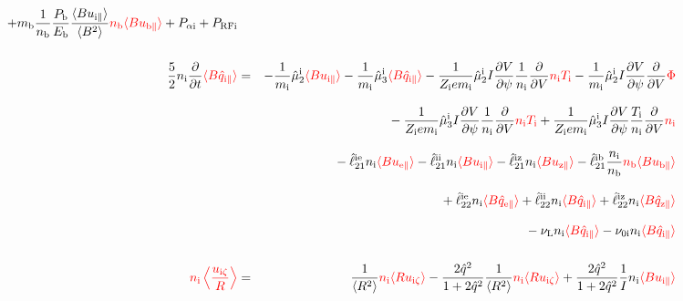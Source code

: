 \documentclass[11pt]{article}
\def\r#1{{\rm#1}}
\def\ave#1{\left\langle#1\right\rangle}
\def\aves#1{\langle#1\rangle}
\def\dd#1#2{\frac{\partial #1}{\partial #2}}
\def\para{\parallel}
\def\ddV{\frac{\partial}{\partial V}}
\def\ddt{\frac{\partial}{\partial t}}
\def\mi{m_\r{i}}
\def\mb{m_\r{b}}
\def\ni{n_\r{i}}
\def\nb{n_\r{b}}
\def\Ti{T_\r{i}}
\def\Zi{Z_\r{i}}
\def\uzt#1{u_{\r{#1}\zeta}}
\def\upara#1{u_{\r{#1}\para}}
\def\qhatpara#1{\hat{q}_{\r{#1}\para}}
\def\nun#1{\nu_\r{0#1}}
\def\PRF#1{P_\r{RF#1}}
\def\Palp#1{P_{\alpha\r{#1}}}
\def\Pb{P_\r{b}}
\def\Eb{E_\r{b}}
\def\nuL{\nu_\r{L}}
\def\red#1{\textcolor{red}{#1}}
\begin{document}
\begin{eqnarray}
%
  + \mb \frac{1}{\nb} \frac{\Pb}{\Eb} \frac{\aves{B
  \upara{i}}}{\aves{B^2}} \red{\nb \aves{B \upara{b}}}
%
  + \Palp{i}
%
  + \PRF{i}
\\[5mm]
 \frac{5}{2} \ni \ddt \red{\aves{B \qhatpara{i}}} &=&
%
  - \frac{1}{\mi} \hat{\mu}_2^\r{i} \red{\aves{B \upara{i}}}
  - \frac{1}{\mi} \hat{\mu}_3^\r{i} \red{\aves{B \qhatpara{i}}}
%
  - \frac{1}{\Zi e\mi} \hat{\mu}_2^\r{i} I \dd{V}{\psi} \frac{1}{\ni}
  \ddV \red{\ni\Ti}
  - \frac{1}{\mi} \hat{\mu}_2^\r{i} I \dd{V}{\psi} \ddV \red{\Phi}
\nonumber\\[3mm]&&{}
%
  - \frac{1}{\Zi e\mi} \hat{\mu}_3^\r{i} I \dd{V}{\psi} \frac{1}{\ni}
  \ddV \red{\ni\Ti}
  + \frac{1}{\Zi e\mi} \hat{\mu}_3^\r{i} I \dd{V}{\psi} \frac{\Ti}{\ni}
  \ddV \red{\ni}
\nonumber\\[3mm]&&{}
%
  - \hat{\ell}_{21}^{\r{ie}} \ni \red{\aves{B \upara{e}}} 
  - \hat{\ell}_{21}^{\r{ii}} \ni \red{\aves{B \upara{i}}} 
  - \hat{\ell}_{21}^{\r{iz}} \ni \red{\aves{B \upara{z}}} 
  - \hat{\ell}_{21}^{\r{ib}} \frac{\ni}{\nb} \red{\nb \aves{B \upara{b}}} 
\nonumber\\[3mm]&&{}
%
  + \hat{\ell}_{22}^{\r{ie}} \ni \red{\aves{B \qhatpara{e}}} 
  + \hat{\ell}_{22}^{\r{ii}} \ni \red{\aves{B \qhatpara{i}}} 
  + \hat{\ell}_{22}^{\r{iz}} \ni \red{\aves{B \qhatpara{z}}} 
\nonumber\\[3mm]&&{}
%
  - \nuL \ni \red{\aves{B \qhatpara{i}}}
%
  - \nun{i} \ni \red{\aves{B \qhatpara{i}}}
\\[5mm]
    \red{\ni \ave{\frac{\uzt{i}}{R}}} &=&
%
    \frac{1}{\aves{R^2}} \red{\ni \aves{R\uzt{i}}}
%
  - \frac{2\hat{q}^2}{1+2\hat{q}^2} \frac{1}{\aves{R^2}}\red{\ni\aves{R\uzt{i}}}
%
  + \frac{2\hat{q}^2}{1+2\hat{q}^2} \frac{1}{I}\ni \red{\aves{B\upara{i}}}
\end{eqnarray}
%

\clearpage
\end{document}

